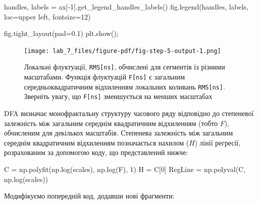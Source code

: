 \documentclass[
  letterpaper,
]{report}
\newenvironment{Shaded}{\begin{snugshade}}{\end{snugshade}}
\newcommand{\DecValTok}[1]{\textcolor[rgb]{0.68,0.00,0.00}{#1}}
\newcommand{\FloatTok}[1]{\textcolor[rgb]{0.68,0.00,0.00}{#1}}
\newcommand{\NormalTok}[1]{\textcolor[rgb]{0.00,0.23,0.31}{#1}}
\newcommand{\OperatorTok}[1]{\textcolor[rgb]{0.37,0.37,0.37}{#1}}
\newcommand{\StringTok}[1]{\textcolor[rgb]{0.13,0.47,0.30}{#1}}
\begin{document}
\begin{Shaded}
\begin{Highlighting}[]
\NormalTok{handles, labels }\OperatorTok{=}\NormalTok{ ax[}\OperatorTok{{-}}\DecValTok{1}\NormalTok{].get\_legend\_handles\_labels()}
\NormalTok{fig.legend(handles, labels, loc}\OperatorTok{=}\StringTok{\textquotesingle{}upper left\textquotesingle{}}\NormalTok{, fontsize}\OperatorTok{=}\DecValTok{12}\NormalTok{)}

\NormalTok{fig.tight\_layout(pad}\OperatorTok{=}\FloatTok{0.1}\NormalTok{)}
\NormalTok{plt.show()}\OperatorTok{;}
\end{Highlighting}
\end{Shaded}

\begin{figure}[H]

{\centering \texttt{[image: lab\_7\_files/figure-pdf/fig-step-5-output-1.png]}

}

\caption{\label{fig-step-5}Локальні флуктуації, \texttt{RMS{[}ns{]}},
обчислені для сегментів із різними масштабами. Функція флуктуацій
\texttt{F{[}ns{]}} є загальним середньоквадратичним відхиленням
локальних коливань \texttt{RMS{[}ns{]}}. Зверніть увагу, що
\texttt{F{[}ns{]}} зменшується на менших масштабах}

\end{figure}

DFA визначає монофрактальну структуру часового ряду відповідно до
степеневої залежність між загальним середнім квадратичним відхиленням
(тобто \(F\)), обчисленим для декількох масштабів. Степенева залежність
між загальним середнім квадратичним відхиленням позначається нахилом
(\(H\)) лінії регресії, розрахованим за допомогою коду, що представлений
нижче:

\begin{Shaded}
\begin{Highlighting}[]
\NormalTok{C }\OperatorTok{=}\NormalTok{ np.polyfit(np.log(scales), np.log(F), }\DecValTok{1}\NormalTok{)}
\NormalTok{H }\OperatorTok{=}\NormalTok{ C[}\DecValTok{0}\NormalTok{]}
\NormalTok{RegLine }\OperatorTok{=}\NormalTok{ np.polyval(C, np.log(scales))}
\end{Highlighting}
\end{Shaded}

Модифікуємо попередній код, додавши нові фрагменти:
\end{document}
